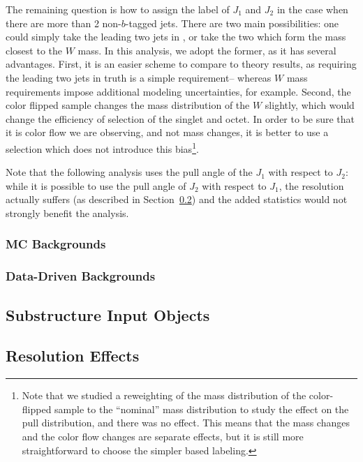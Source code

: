 
The remaining question is how to assign the label of $J_1$ and $J_2$ in the case when there are more than 2 non-$b$-tagged jets. There are two main possibilities: one could simply take the leading two jets in \pt, or take the two which form the mass closest to the $W$ mass. In this analysis, we adopt the former, as it has several advantages. First, it is an easier scheme to compare to theory results, as requiring the leading two jets in truth is a simple requirement-- whereas $W$ mass requirements impose additional modeling uncertainties, for example. Second, the color flipped sample changes the mass distribution of the $W$ slightly, which would change the efficiency of selection of the singlet and octet. In order to be sure that it is color flow we are observing, and not mass changes, it is better to use a selection which does not introduce this bias\footnote{Note that we studied a reweighting of the mass distribution of the color-flipped sample to the ``nominal'' mass distribution to study the effect on the pull distribution, and there was no effect. This means that the mass changes and the color flow changes are separate effects, but it is still more straightforward to choose the simpler \pt based labeling.}.

Note that the following analysis uses the pull angle of the $J_1$ with respect to $J_2$: while it is possible to use the pull angle of $J_2$ with respect to $J_1$, the resolution actually suffers (as described in Section~\ref{chapter:color:reconstruction:resolution}) and the added statistics would not strongly benefit the analysis.

	\subsubsection{MC Backgrounds}


	\subsubsection{Data-Driven Backgrounds}


	\subsection{Substructure Input Objects}
	\subsection{Resolution Effects}
	\label{chapter:color:reconstruction:resolution}
